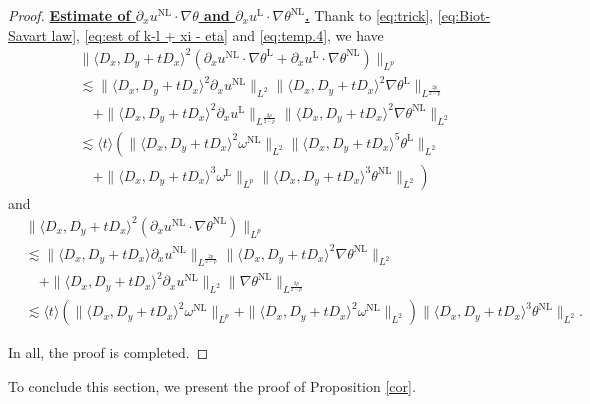 \documentclass[reqno, 12pt]{amsart} %
\theoremstyle{plain} %
\theoremstyle{definition}
\theoremstyle{remark}
\numberwithin{equation}{section} %
\newcommand{\px}{\partial_x}
\begin{document}
\begin{proof}
		\underline{\bf Estimate of $ \px u^{\mathrm{NL}} \cdot \nabla \theta $ and $\px u^{\mathrm{L}} \cdot \nabla \theta ^{\mathrm{NL}} $.}
		Thank to \eqref{eq:trick}, \eqref{eq:Biot-Savart law}, \eqref{eq:est of k-l + xi - eta} and \eqref{eq:temp.4}, we have
		$$
		\begin{aligned}
			& \|\langle D_x, D_y+t D_x\rangle^2\left( \px u^{\mathrm{NL}} \cdot \nabla  \theta^{\mathrm{L}}+ \px u^{\mathrm{L}} \cdot \nabla   \theta^{\mathrm{NL}}\right)\|_{L^p} \\
			& \lesssim\|\langle D_x, D_y+t D_x\rangle^2 \px u^{\mathrm{NL}}\|_{L^2}\|\langle D_x, D_y+t D_x\rangle^2 \nabla  \theta^{\mathrm{L}}\|_{L^\frac{2 p}{2-p}} \\
			& \quad+\|\langle D_x, D_y+t D_x\rangle^2 \px u^{\mathrm{L}}\|_{L^{\frac{2 p}{2-p}}}\|\langle D_x, D_y+t D_x\rangle^2 \nabla  \theta^{\mathrm{NL}}\|_{L^2} \\
			& \lesssim  \langle t\rangle \left(  \|\langle D_x, D_y+t D_x\rangle^2 \omega^{\mathrm{NL}}\|_{L^2}\|\langle D_x, D_y+t D_x\rangle^5 \theta^{\mathrm{L}}\|_{L^2}\right. \\
			& \left.\quad+ \|\langle D_x, D_y+t D_x\rangle^3 \omega^{\mathrm{L}}\|_{L^p}   \|\langle D_x, D_y+t D_x\rangle^3  \theta^{\mathrm{NL}}\|_{L^2}\right) 
		\end{aligned}
		$$
		and
		$$
		\begin{aligned}
			& \|\langle D_x, D_y+t D_x\rangle^2\left( \px u^{\mathrm{NL}} \cdot \nabla  \theta^{\mathrm{NL}} \right)\|_{L^p} \\
			& \lesssim\|\langle D_x, D_y+t D_x\rangle \px u^{\mathrm{NL}}\|_{L^\frac{2 p}{2-p}}\|\langle D_x, D_y+t D_x\rangle^2 \nabla  \theta^{\mathrm{NL}}\|_{L^2} \\
			& \quad+\|\langle D_x, D_y+t D_x\rangle^2 \px u^{\mathrm{NL}}\|_{L^2}\| \nabla  \theta^{\mathrm{NL}}\|_{L^\frac{2 p}{2-p}} \\
			& \lesssim  \langle t\rangle (  \|\langle D_x, D_y+t D_x\rangle^2 \omega^{\mathrm{NL}}\|_{L^p}+ \|\langle D_x, D_y+t D_x\rangle^2 \omega^{\mathrm{NL}}\|_{L^2} ) \|\langle D_x, D_y+t D_x\rangle^3 \theta^{\mathrm{NL}}\|_{L^2}.
		\end{aligned}
		$$
		
		In all, the proof is completed.
	\end{proof}
	
	
	To conclude this section, we present the proof of Proposition \ref{cor}.
	
\end{document}
